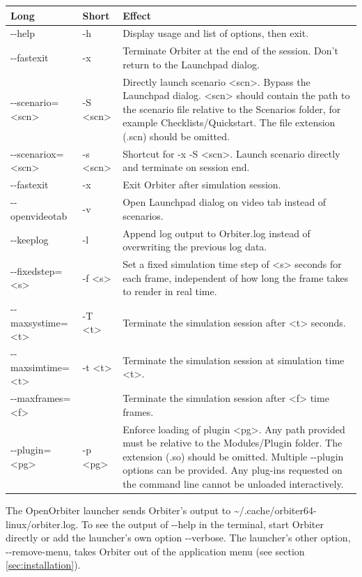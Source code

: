 \documentclass[Orbiter User Manual.tex]{subfiles}
\begin{document}
	\begin{longtable}{ |p{}|p{}|p{}| }
	\hline\rule{0pt}{2ex}
	\textbf{Long} & \textbf{Short} & \textbf{Effect}\\
	\hline\rule{0pt}{2ex}
	-{}-help & -h & Display usage and list of options, then exit.\\
	\hline\rule{0pt}{2ex}
	-{}-fastexit & -x & Terminate Orbiter at the end of the session. Don't return to the Launchpad dialog.\\
	\hline\rule{0pt}{2ex}
	-{}-scenario=<scn> & -S <scn> & Directly launch scenario <scn>. Bypass the Launchpad dialog. <scn> should contain the path to the scenario file relative to the Scenarios folder, for example Checklists/Quickstart. The file extension (.scn) should be omitted.\\
	\hline\rule{0pt}{2ex}
	-{}-scenariox=<scn> & -s <scn> & Shortcut for -x -S <scn>. Launch scenario directly and terminate on session end.\\
	\hline\rule{0pt}{2ex}
	-{}-fastexit & -x & Exit Orbiter after simulation session.\\
	\hline\rule{0pt}{2ex}
	-{}-openvideotab & -v & Open Launchpad dialog on video tab instead of scenarios.\\
	\hline\rule{0pt}{2ex}
	-{}-keeplog & -l & Append log output to Orbiter.log instead of overwriting the previous log data.\\
	\hline\rule{0pt}{2ex}
	-{}-fixedstep=<s> & -f <s> & Set a fixed simulation time step of <s> seconds for each frame, independent of how long the frame takes to render in real time.\\
	\hline\rule{0pt}{2ex}
	-{}-maxsystime=<t> & -T <t> & Terminate the simulation session after <t> seconds.\\
	\hline\rule{0pt}{2ex}
	-{}-maxsimtime=<t> & -t <t> & Terminate the simulation session at simulation time <t>.\\
	\hline\rule{0pt}{2ex}
	-{}-maxframes=<f> & & Terminate the simulation session after <f> time frames.\\
	\hline\rule{0pt}{2ex}
	-{}-plugin=<pg> & -p <pg> & Enforce loading of plugin <pg>. Any path provided must be relative to the Modules/Plugin folder. The extension (.so) should be omitted. Multiple -{}-plugin options can be provided. Any plug-ins requested on the command line cannot be unloaded interactively.\\
	\hline
	\end{longtable}

\noindent
The OpenOrbiter launcher sends Orbiter's output to \textasciitilde/.cache/orbiter64-linux/orbiter.log. To see the output of -{}-help in the terminal, start Orbiter directly or add the launcher's own option -{}-verbose. The launcher's other option, -{}-remove-menu, takes Orbiter out of the application menu (see section \ref{sec:installation}).
\end{document}
